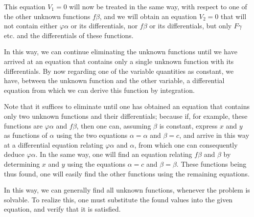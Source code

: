 \documentclass[oneside, 12 pt, leqno]{memoir}
\begin{document}
%
This equation \(V_{1}=0\) will now be treated in the same way, with respect to one of the other unknown functions \(f \beta\), and we will obtain an equation \(V_2=0\) that will not contain either \(\varphi \alpha\) or its differentials, nor \(f \beta\) or its differentials, but only \(F \gamma\) etc. and the differentials of these functions.

%
In this way, we can continue eliminating the unknown functions until we have arrived at an equation that contains only a single unknown function with its differentials. By now regarding one of the variable quantities as constant, we have, between the unknown function and the other variable, a differential equation from which we can derive this function by integration.

%
Note that it suffices to eliminate until one has obtained an equation that contains only two unknown functions and their differentials; because if, for example, these functions are \(\varphi \alpha\) and \(f \beta\), then one can, assuming \(\beta\) is constant, express \(x\) and \(y\) as functions of \(\alpha\) using the two equations \(\alpha=\alpha\) and \(\beta=c\), and arrive in this way at a differential equation relating \(\varphi \alpha\) and \(\alpha\), from which one can consequently deduce \(\varphi \alpha\). In the same way, one will find an equation relating \(f \beta\) and \(\beta\) by determining \(x\) and \(y\) using the equations \(\alpha=c\) and \(\beta=\beta\). These functions being thus found, one will easily find the other functions using the remaining equations.

%
In this way, we can generally find all unknown functions, whenever the problem is solvable. To realize this, one must substitute the found values into the given equation, and verify that it is satisfied.
\end{document}
